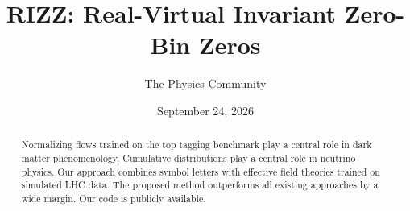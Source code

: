 \documentclass[11pt]{article}
\title{RIZZ: Real-Virtual Invariant Zero-Bin Zeros}
\author{The Physics Community}
\date{September 24, 2026}
\numberwithin{equation}{section}
\theoremstyle{definition}
\theoremstyle{remark}
\begin{document}
\maketitle
\begin{abstract}
Normalizing flows trained on the top tagging benchmark play a central
role in dark matter phenomenology. Cumulative distributions play a
central role in neutrino physics. Our approach combines symbol letters
with effective field theories trained on simulated LHC data. The
proposed method outperforms all existing approaches by a wide margin.
Our code is publicly available.
\end{abstract}
\tableofcontents




\nocite{*}


\end{document}

